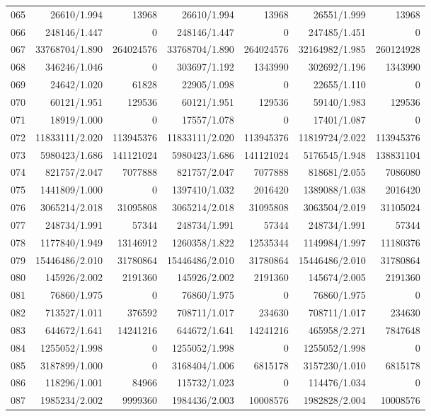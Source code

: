 \begin{longtable}{crrrrrr}
065 & 26610/1.994 & 13968 & 26610/1.994 & 13968 & 26551/1.999 & 13968 \\
066 & 248146/1.447 & 0 & 248146/1.447 & 0 & 247485/1.451 & 0 \\
067 & 33768704/1.890 & 264024576 & 33768704/1.890 & 264024576 & 32164982/1.985 & 260124928 \\
068 & 346246/1.046 & 0 & 303697/1.192 & 1343990 & 302692/1.196 & 1343990 \\
069 & 24642/1.020 & 61828 & 22905/1.098 & 0 & 22655/1.110 & 0 \\
070 & 60121/1.951 & 129536 & 60121/1.951 & 129536 & 59140/1.983 & 129536 \\
071 & 18919/1.000 & 0 & 17557/1.078 & 0 & 17401/1.087 & 0 \\
072 & 11833111/2.020 & 113945376 & 11833111/2.020 & 113945376 & 11819724/2.022 & 113945376 \\
073 & 5980423/1.686 & 141121024 & 5980423/1.686 & 141121024 & 5176545/1.948 & 138831104 \\
074 & 821757/2.047 & 7077888 & 821757/2.047 & 7077888 & 818681/2.055 & 7086080 \\
075 & 1441809/1.000 & 0 & 1397410/1.032 & 2016420 & 1389088/1.038 & 2016420 \\
076 & 3065214/2.018 & 31095808 & 3065214/2.018 & 31095808 & 3063504/2.019 & 31105024 \\
077 & 248734/1.991 & 57344 & 248734/1.991 & 57344 & 248734/1.991 & 57344 \\
078 & 1177840/1.949 & 13146912 & 1260358/1.822 & 12535344 & 1149984/1.997 & 11180376 \\
079 & 15446486/2.010 & 31780864 & 15446486/2.010 & 31780864 & 15446486/2.010 & 31780864 \\
080 & 145926/2.002 & 2191360 & 145926/2.002 & 2191360 & 145674/2.005 & 2191360 \\
081 & 76860/1.975 & 0 & 76860/1.975 & 0 & 76860/1.975 & 0 \\
082 & 713527/1.011 & 376592 & 708711/1.017 & 234630 & 708711/1.017 & 234630 \\
083 & 644672/1.641 & 14241216 & 644672/1.641 & 14241216 & 465958/2.271 & 7847648 \\
084 & 1255052/1.998 & 0 & 1255052/1.998 & 0 & 1255052/1.998 & 0 \\
085 & 3187899/1.000 & 0 & 3168404/1.006 & 6815178 & 3157230/1.010 & 6815178 \\
086 & 118296/1.001 & 84966 & 115732/1.023 & 0 & 114476/1.034 & 0 \\
087 & 1985234/2.002 & 9999360 & 1984436/2.003 & 10008576 & 1982828/2.004 & 10008576 \\

\end{longtable}
